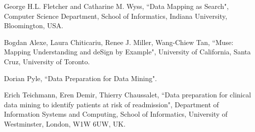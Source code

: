 \documentclass{report}
\begin{document}
\newpage

%
\begin{thebibliography}{100} %
 George H.L. Fletcher and Catharine M. Wyss, ``Data Mapping as Search", Computer Science Department, School of Informatics, Indiana University, Bloomington, USA. 
 
 Bogdan Alexe, Laura Chiticariu, Renee J. Miller, Wang-Chiew Tan, ``Muse: Mapping Understanding and deSign by Example", University of California, Santa Cruz, University of Toronto. 
 
 Dorian Pyle, ``Data Preparation for Data Mining".
 
 Erich Teichmann, Eren Demir, Thierry Chaussalet, ``Data preparation for clinical data mining to identify patients at risk of readmission", Department of Information Systems and Computing, School of Informatics, University of Westminster, London, W1W 6UW, UK.
\end{thebibliography} 
\end{document}

